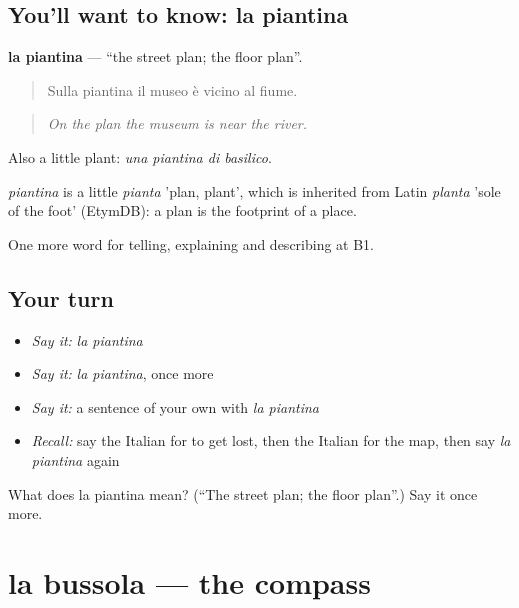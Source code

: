 \subsection*{You'll want to know: la piantina}
\textbf{la piantina} — \textquotedblleft{}the street plan; the floor plan\textquotedblright{}.

\begin{quote}
Sulla piantina il museo è vicino al fiume.
\end{quote}

\begin{quote}
\emph{On the plan the museum is near the river.}
\end{quote}

Also a little plant: \emph{una piantina di basilico}.

\begin{cousinweb}
\emph{piantina} is a little \emph{pianta} 'plan, plant', which is inherited from Latin \emph{planta} 'sole of the foot' (EtymDB): a plan is the footprint of a place.
\end{cousinweb}

\begin{grammarlens}[title={What you've built}]
One more word for telling, explaining and describing at B1.
\end{grammarlens}

\subsection*{Your turn}
\begin{itemize}
\raggedright
  \item \emph{Say it:} \emph{la piantina}
  \item \emph{Say it:} \emph{la piantina}, once more
  \item \emph{Say it:} a sentence of your own with \emph{la piantina}
  \item \emph{Recall:} say the Italian for to get lost, then the Italian for the map, then say \emph{la piantina} again
\end{itemize}

\begin{tcolorbox}[breakable,colback=teal!4,colframe=teal!35!black,title={Before you move on}]
What does la piantina mean? (\textquotedblleft{}The street plan; the floor plan\textquotedblright{}.) Say it once more.
\end{tcolorbox}
\section[la bussola]{la bussola — the compass}

